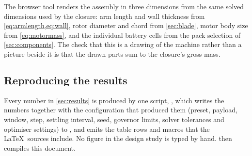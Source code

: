 The browser tool renders the assembly in three dimensions from the same solved
dimensions used by the closure: arm length and wall thickness from
\cref{eq:armlength,eq:wall}, rotor diameter and chord from
\cref{sec:blade}, motor body size from \cref{eq:motormass}, and the individual
battery cells from the pack selection of \cref{sec:components}. The check that
this is a drawing of the machine rather than a picture beside it is that the
drawn parts sum to the closure's gross mass.

\subsection{Reproducing the results}

Every number in \cref{sec:results} is produced by one script,
, which writes the numbers together with the
configuration that produced them (preset, payload, window, step, settling
interval, seed, governor limits, solver tolerances and optimiser settings) to
, and emits the table rows and macros that the
\LaTeX\ sources include. No figure in the design study is typed by hand.
 then compiles this document.
